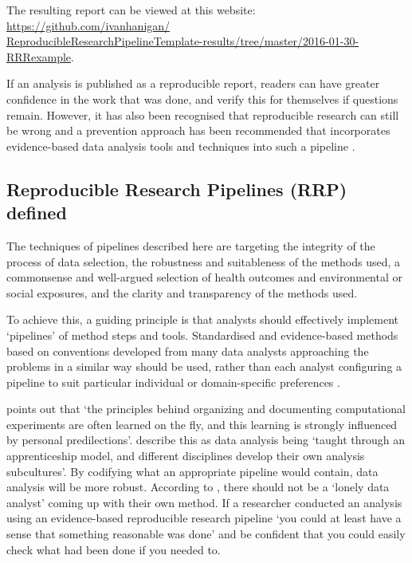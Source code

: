 \documentclass[11pt,a4paper]{article}
\begin{document}
The resulting report can be viewed at this website: \href{https://github.com/ivanhanigan/ReproducibleResearchPipelineTemplate-results/tree/master/2016-01-30-RRRexample}{https://github.com/ivanhanigan/} \\
\href{https://github.com/ivanhanigan/ReproducibleResearchPipelineTemplate-results/tree/master/2016-01-30-RRRexample}{ReproducibleResearchPipelineTemplate-results/tree/master/2016-01-30-RRRexample}.


If an analysis is published as a reproducible report, readers can have greater confidence 
in the work that was done, and verify this for themselves if questions remain. However, it has also been recognised that reproducible research can still be wrong and a
prevention approach has been recommended that incorporates
evidence-based data analysis tools and techniques into such a pipeline
\citep{Leek2015a}.

\subsection{Reproducible Research Pipelines (RRP) defined}


The techniques of pipelines described here are targeting the integrity
of the process of data selection, the robustness and suitableness of the
methods used, a commonsense and well-argued selection of health outcomes
and environmental or social exposures, and the clarity and transparency
of the methods used.

To achieve this, a guiding principle is that analysts should effectively
implement `pipelines' of method steps and tools. Standardised and
evidence-based methods based on conventions developed from many data
analysts approaching the problems in a similar way should be used,
rather than each analyst configuring a pipeline to suit particular
individual or domain-specific preferences \citep{Borer2009a,White2013}.

\citet{Noble2009} points out that `the principles behind organizing and
documenting computational experiments are often learned on the fly, and
this learning is strongly influenced by personal predilections'. 
\citet{Leek2015b} describe this as data analysis being `taught through an
apprenticeship model, and different disciplines develop their own
analysis subcultures'. By codifying what an appropriate pipeline would
contain, data analysis will be more robust. According to \citet{Peng},
there should not be a `lonely data analyst' coming up with their own
method. If a researcher conducted an analysis using an evidence-based
reproducible research pipeline `you could at least have a sense that
something reasonable was done' \citet{Peng} and be confident that you could easily
check what had been done if you needed to.
\end{document}
